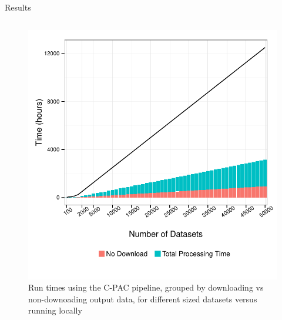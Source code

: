 \documentclass[final,hyperref={pdfpagelabels=false}]{beamer}
\begin{document}
\begin{frame}
\begin{columns}
\begin{column}{.5\textwidth}
{\begin{block}{Results}
\begin{column}{.49\textwidth}
\begin{figure}
                  \end{figure}
                  \begin{figure}
                      \includegraphics[width=.99\textwidth]{cpac-times.pdf}
                      \caption{\label{fig:cpac-times}Run times using the C-PAC pipeline, grouped by downloading vs non-downoading output data, for different sized datasets versus running locally}
                  \end{figure}

\end{column}
\end{block}}
\end{column}
\end{columns}
\end{frame}
\end{document}

